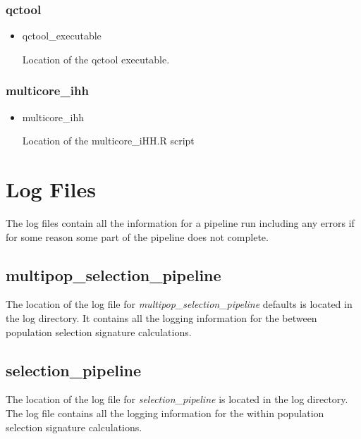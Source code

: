 \documentclass[a4paper,10pt]{article}
\begin{document}
\subsubsection{qctool}
\begin{itemize}
\item qctool\_executable

Location of the qctool executable.
\end{itemize}
\subsubsection{multicore\_ihh}
\begin{itemize}
\item multicore\_ihh

Location of the multicore\_iHH.R script



\end{itemize}
\section{Log Files}
The log files contain all the information for a pipeline run including any errors if for some reason some part of the pipeline does not complete.
\subsection{multipop\_selection\_pipeline}
The location of the log file for  \emph{multipop\_selection\_pipeline} defaults is
located in the log directory. It contains all the logging information
for the between population selection signature calculations.

\subsection{selection\_pipeline}
The location of the log file for \emph{selection\_pipeline} is located
in the log directory. The log file contains all the logging
information for the within population selection signature
calculations.
\end{document}
